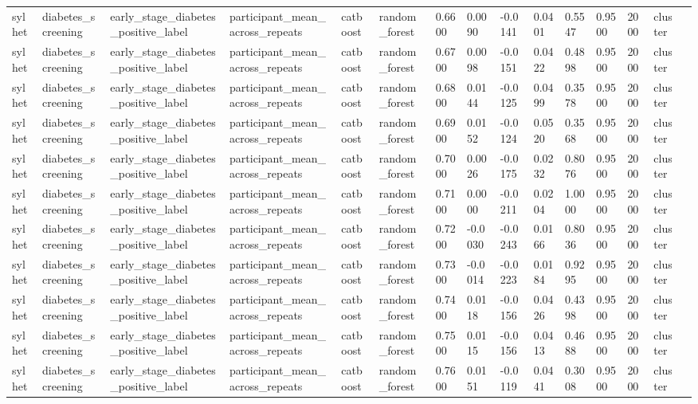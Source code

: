 \begin{tabular}{lllllllllllllll}
sylhet & diabetes\_screening & early\_stage\_diabetes\_positive\_label & participant\_mean\_across\_repeats & catboost & random\_forest & 0.6600 & 0.0090 & -0.0141 & 0.0401 & 0.5547 & 0.9500 & 2000 & cluster &  \\
sylhet & diabetes\_screening & early\_stage\_diabetes\_positive\_label & participant\_mean\_across\_repeats & catboost & random\_forest & 0.6700 & 0.0098 & -0.0151 & 0.0422 & 0.4898 & 0.9500 & 2000 & cluster &  \\
sylhet & diabetes\_screening & early\_stage\_diabetes\_positive\_label & participant\_mean\_across\_repeats & catboost & random\_forest & 0.6800 & 0.0144 & -0.0125 & 0.0499 & 0.3578 & 0.9500 & 2000 & cluster &  \\
sylhet & diabetes\_screening & early\_stage\_diabetes\_positive\_label & participant\_mean\_across\_repeats & catboost & random\_forest & 0.6900 & 0.0152 & -0.0124 & 0.0520 & 0.3568 & 0.9500 & 2000 & cluster &  \\
sylhet & diabetes\_screening & early\_stage\_diabetes\_positive\_label & participant\_mean\_across\_repeats & catboost & random\_forest & 0.7000 & 0.0026 & -0.0175 & 0.0232 & 0.8076 & 0.9500 & 2000 & cluster &  \\
sylhet & diabetes\_screening & early\_stage\_diabetes\_positive\_label & participant\_mean\_across\_repeats & catboost & random\_forest & 0.7100 & 0.0000 & -0.0211 & 0.0204 & 1.0000 & 0.9500 & 2000 & cluster &  \\
sylhet & diabetes\_screening & early\_stage\_diabetes\_positive\_label & participant\_mean\_across\_repeats & catboost & random\_forest & 0.7200 & -0.0030 & -0.0243 & 0.0166 & 0.8036 & 0.9500 & 2000 & cluster &  \\
sylhet & diabetes\_screening & early\_stage\_diabetes\_positive\_label & participant\_mean\_across\_repeats & catboost & random\_forest & 0.7300 & -0.0014 & -0.0223 & 0.0184 & 0.9295 & 0.9500 & 2000 & cluster &  \\
sylhet & diabetes\_screening & early\_stage\_diabetes\_positive\_label & participant\_mean\_across\_repeats & catboost & random\_forest & 0.7400 & 0.0118 & -0.0156 & 0.0426 & 0.4398 & 0.9500 & 2000 & cluster &  \\
sylhet & diabetes\_screening & early\_stage\_diabetes\_positive\_label & participant\_mean\_across\_repeats & catboost & random\_forest & 0.7500 & 0.0115 & -0.0156 & 0.0413 & 0.4688 & 0.9500 & 2000 & cluster &  \\
sylhet & diabetes\_screening & early\_stage\_diabetes\_positive\_label & participant\_mean\_across\_repeats & catboost & random\_forest & 0.7600 & 0.0151 & -0.0119 & 0.0441 & 0.3008 & 0.9500 & 2000 & cluster &  \\

\end{tabular}
